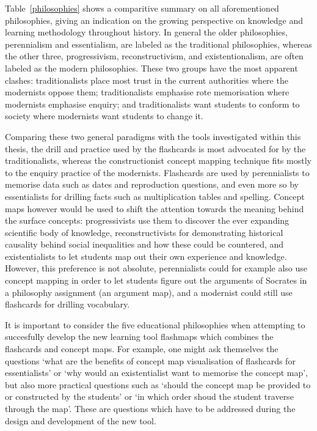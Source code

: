 Table~\ref{philosophies} shows a comparitive summary on all aforementioned philosophies, giving an indication on the growing perspective on knowledge and learning methodology throughout history. In general the older philosophies, perennialism and essentialism, are labeled as the traditional philosophies, whereas the other three, progressivism, reconstructivism, and existentionalism, are often labeled as the modern philosophies. These two groups have the most apparent clashes: traditionalists place most trust in the current authorities where the modernists oppose them; traditionalists emphasise rote memorisation where modernists emphasise enquiry; and traditionalists want students to conform to society where modernists want students to change it.

Comparing these two general paradigms with the tools investigated within this thesis, the drill and practice used by the flashcards is most advocated for by the traditionalists, whereas the constructionist concept mapping technique fits mostly to the enquiry practice of the modernists. Flashcards are used by perennialists to memorise data such as dates and reproduction questions, and even more so by essentialists for drilling facts such as multiplication tables and spelling. Concept maps however would be used to shift the attention towards the meaning behind the surface concepts: progressivists use them to discover the ever expanding scientific body of knowledge, reconstructivists for demonstrating historical causality behind social inequalities and how these could be countered, and existentialists to let students map out their own experience and knowledge. However, this preference is not absolute, perennialists could for example also use concept mapping in order to let students figure out the arguments of Socrates in a philosophy assignment (an argument map), and a modernist could still use flashcards for drilling vocabulary.

It is important to consider the five educational philosophies when attempting to succesfully develop the new learning tool flashmaps which combines the flashcards and concept maps. For example, one might ask themselves the questions `what are the benefits of concept map visualisation of flashcards for essentialists' or `why would an existentialist want to memorise the concept map', but also more practical questions such as `should the concept map be provided to or constructed by the students' or `in which order shoud the student traverse through the map'. These are questions which have to be addressed during the design and development of the new tool.

